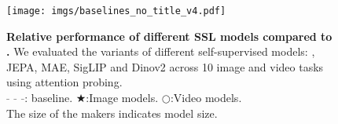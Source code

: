 \begin{figure}[t]
\centering
\vspace{-2mm}
\texttt{[image: imgs/baselines\_no\_title\_v4.pdf]}
\vspace{-5mm}
\caption{
\textbf{Relative performance of different SSL models compared to \iwalt.}  We evaluated the variants of different self-supervised models: \vwalt, JEPA, MAE, SigLIP and Dinov2 across 10 image and video tasks using attention probing.\\
\textcolor{gray}{- - -}: \iwalt baseline. $\bigstar$:\;Image models. $\bigcirc$:\;Video models.\\ The size of the makers indicates model size.
}
\vspace{-2.5mm}
\label{fig:baselines}
\end{figure}
